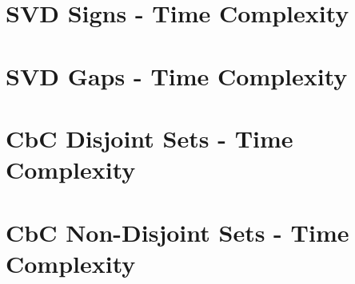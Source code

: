\documentclass[ClusteringConnectionsMAIN.tex]{subfiles}
\begin{document}
%
%
\chapter{SVD Signs - Time Complexity}



%
%
\chapter{SVD Gaps - Time Complexity}



%
%
\chapter{CbC Disjoint Sets - Time Complexity}



%
%
\chapter{CbC Non-Disjoint Sets - Time Complexity}

\end{document}
